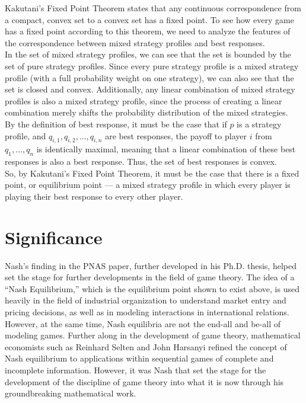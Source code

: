 \documentclass[12pt]{extarticle}
\begin{document}
  Kakutani's Fixed Point Theorem states that any continuous correspondence from a compact, convex set to a convex set has a fixed point. To see how every game has a fixed point according to this theorem, we need to analyze the features of the correspondence between mixed strategy profiles and best responses.\\

  In the set of mixed strategy profiles, we can see that the set is bounded by the set of pure strategy profiles. Since every pure strategy profile is a mixed strategy profile (with a full probability weight on one strategy), we can also see that the set is closed and convex. Additionally, any linear combination of mixed strategy profiles is also a mixed strategy profile, since the process of creating a linear combination merely shifts the probability distribution of the mixed strategies.\\

  By the definition of best response, it must be the case that if $p$ is a strategy profile, and $q_{i,1},q_{i,2},\dots,q_{i,n}$ are best responses, the payoff to player $i$ from $q_1,\dots,q_n$ is identically maximal, meaning that a linear combination of these best responses is also a best response. Thus, the set of best responses is convex.\\

  So, by Kakutani's Fixed Point Theorem, it must be the case that there is a fixed point, or equilibrium point --- a mixed strategy profile in which every player is playing their best response to every other player.
  \section*{Significance}%
  Nash's finding in the PNAS paper, further developed in his Ph.D. thesis, helped set the stage for further developments in the field of game theory. The idea of a ``Nash Equilibrium,'' which is the equilibrium point shown to exist above, is used heavily in the field of industrial organization to understand market entry and pricing decisions, as well as in modeling interactions in international relations.\\

  However, at the same time, Nash equilibria are not the end-all and be-all of modeling games. Further along in the development of game theory, mathematical economists such as Reinhard Selten and John Harsanyi refined the concept of Nash equilibrium to applications within sequential games of complete and incomplete information.\supercite{nash_selten_harsanyi_nobel} However, it was Nash that set the stage for the development of the discipline of game theory into what it is now through his groundbreaking mathematical work.
  \printbibliography
\end{document}
